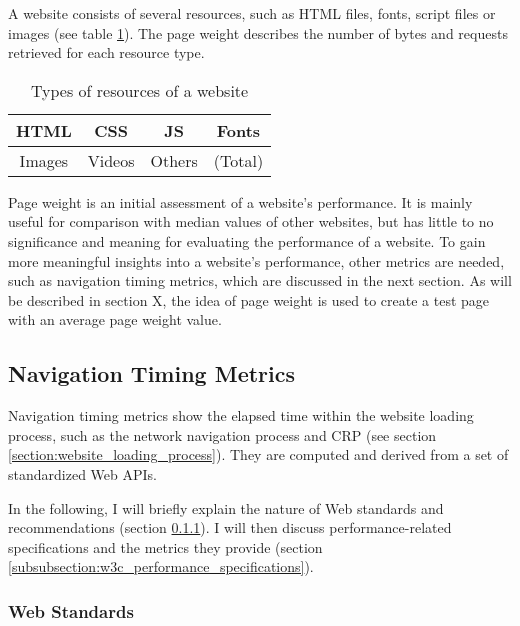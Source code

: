 A website consists of several resources, such as HTML files, fonts, script files or images (see table \ref{table:website_resources}).
The page weight describes the number of bytes and requests retrieved for each resource type. %

\begin{table}[h]
	\small
	\centering
	\begin{tabular}{| c | c | c | c | }
	\hline
	HTML & CSS  & JS & Fonts \\
	\hline
	Images & Videos & Others & (Total) \\
	\hline
	\end{tabular}
	\medskip
	\caption{Types of resources of a website}
	\label{table:website_resources}
\end{table}

Page weight is an initial assessment of a website's performance.
It is mainly useful for comparison with median values of other websites, but has little to no significance and meaning for evaluating the performance of a website.
To gain more meaningful insights into a website's performance, other metrics are needed, such as navigation timing metrics, which are discussed in the next section.
As will be described in section X, the idea of page weight is used to create a test page with an average page weight value.




\subsection{Navigation Timing Metrics} %
\label{subsection:navigation_timing_metrics}

Navigation timing metrics show the elapsed time within the website loading process, such as the network navigation process and CRP (see section \ref{section:website_loading_process}).
They are computed and derived from a set of standardized Web APIs.

In the following, I will briefly explain the nature of Web standards and recommendations (section \ref{subsubsection:web_standards}).
I will then discuss performance-related specifications and the metrics they provide (section \ref{subsubsection:w3c_performance_specifications}).



\subsubsection{Web Standards} %
\label{subsubsection:web_standards}

